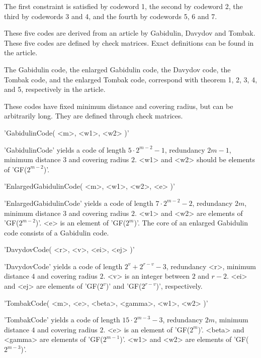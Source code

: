 The first constraint is satisfied by codeword 1,
the second by codeword 2,
the third by codewords 3 and 4,
and the fourth by codewords 5, 6 and 7.




These five codes are derived from an article by
Gabidulin, Davydov and Tombak.
These five codes are defined by check matrices.
Exact definitions can be found in the article.

The Gabidulin code, the enlarged Gabidulin code, the Davydov code,
the Tombak code, and the enlarged Tombak code, correspond with
theorem 1, 2, 3, 4, and 5, respectively in the article.

These codes have fixed minimum distance and covering radius,
but can be arbitrarily long. They are defined through
check matrices.

'GabidulinCode( <m>, <w1>, <w2> )'

'GabidulinCode' yields a code of length $5 \cdot 2^{m-2}-1$,
redundancy $2m-1$, minimum distance $3$ and covering radius $2$.
<w1> and <w2> should be elements of 'GF($2^{m-2}$)'.

'EnlargedGabidulinCode( <m>, <w1>, <w2>, <e> )'

'EnlargedGabidulinCode' yields a code of length $7 \cdot 2^{m-2}-2$,
redundancy $2m$, minimum distance $3$ and covering radius $2$.
<w1> and <w2> are elements of 'GF($2^{m-2}$)'.
<e> is an element of 'GF($2^m$)'.
The core of an enlarged Gabidulin code consists of a Gabidulin code.

'DavydovCode( <r>, <v>, <ei>, <ej> )'

'DavydovCode' yields a code of length $2^v + 2^{r-v} - 3$,
redundancy <r>, minimum distance $4$ and covering radius $2$.
<v> is an integer between $2$ and $r-2$.
<ei> and <ej> are elements of 'GF($2^v$)' and 'GF($2^{r-v}$)',
respectively.

'TombakCode( <m>, <e>, <beta>, <gamma>, <w1>, <w2> )'

'TombakCode' yields a code of length $15 \cdot 2^{m-3} - 3$,
redundancy $2m$, minimum distance $4$ and covering radius $2$.
<e> is an element of 'GF($2^m$)'.
<beta> and <gamma> are elements of 'GF($2^{m-1}$)'.
<w1> and <w2> are elements of 'GF($2^{m-3}$)'.

